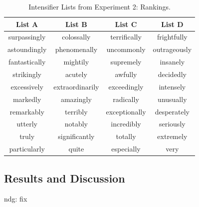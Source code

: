 \documentclass[10pt,letterpaper]{article}
\newcommand{\todo}[1]{{\color{red}#1}}
\begin{document}
\begin{table}[ht]
\begin{center} 
\footnotesize
\caption{Intensifier Lists from Experiment 2: Rankings.} 
\label{exp2-intensifiers} 
\vskip 0.12in
\begin{tabular}{cccc} 
\hline
List A    &  List B & List C & List D \\
\hline
surpassingly & colossally & terrifically & frightfully \\
astoundingly & phenomenally & uncommonly & outrageously \\
fantastically & mightily & supremely & insanely \\
strikingly & acutely & awfully & decidedly \\
excessively & extraordinarily & exceedingly & intensely \\
markedly & amazingly & radically & unusually \\
remarkably & terribly & exceptionally & desperately \\
utterly & notably & incredibly & seriously \\
truly & significantly & totally & extremely \\
particularly & quite & especially & very
\end{tabular}
\end{center}
\end{table}

\subsection{Results and Discussion}

\todo{ndg: fix}

\end{document}
